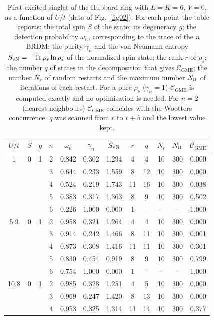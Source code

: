 \documentclass[12pt]{article}
\begin{document}
\begin{table}
\caption{First excited singlet of the Hubbard ring with $L=K=6$, $V=0$, as a function of $U/t$ (data of Fig.~\ref{fig02}). For each point the table reports: the total spin $S$ of the state; its degeneracy $g$; the detection probability $\omega_n$, corresponding to the trace of the $n$BRDM; the purity $\gamma_n$ and the von Neumann entropy $S_{\rm vN}=-\mathrm{Tr}\,\rho_s\ln\rho_s$ of the normalized spin state; the rank $r$ of $\rho_s$; the number $q$ of states in the decomposition that gives $\mathcal{C}_{\mathrm{GME}}$; the number $N_r$ of random restarts and the maximum number $N_{\rm it}$ of iterations of each restart. For a pure $\rho_s$ ($\gamma_n=1$) $\mathcal{C}_{\mathrm{GME}}$ is computed exactly and no optimisation is needed. For $n=2$ (nearest neighbours) $\mathcal{C}_{\mathrm{GME}}$ coincides with the Wootters concurrence. $q$ was scanned from $r$ to $r+5$ and the lowest value kept.}
\label{tab:uscan_es_L6}
\begin{ruledtabular}
\begin{tabular}{cccccccccccc}
$U/t$ & $S$ & $g$ & $n$ & $\omega_n$ & $\gamma_n$ & $S_{\rm vN}$ & $r$ & $q$ & $N_r$ & $N_{\rm it}$ & $\mathcal{C}_{\mathrm{GME}}$ \\
\hline
1 & 0 & 1 & 2 & 0.842 & 0.302 & 1.294 & 4 & 4 & 10 & 300 & 0.000 \\
 & &  & 3 & 0.644 & 0.233 & 1.559 & 8 & 12 & 10 & 300 & 0.000 \\
 & &  & 4 & 0.524 & 0.219 & 1.743 & 11 & 16 & 10 & 300 & 0.038 \\
 & &  & 5 & 0.383 & 0.317 & 1.363 & 8 & 9 & 10 & 300 & 0.502 \\
 & &  & 6 & 0.226 & 1.000 & 0.000 & 1 & -- & -- & -- & 1.000 \\
\hline
5.9 & 0 & 1 & 2 & 0.958 & 0.321 & 1.264 & 4 & 4 & 10 & 300 & 0.000 \\
 & &  & 3 & 0.914 & 0.242 & 1.466 & 8 & 11 & 10 & 300 & 0.001 \\
 & &  & 4 & 0.873 & 0.308 & 1.416 & 11 & 11 & 10 & 300 & 0.301 \\
 & &  & 5 & 0.830 & 0.454 & 0.919 & 8 & 9 & 10 & 300 & 0.799 \\
 & &  & 6 & 0.754 & 1.000 & 0.000 & 1 & -- & -- & -- & 1.000 \\
\hline
10.8 & 0 & 1 & 2 & 0.985 & 0.328 & 1.251 & 4 & 5 & 10 & 300 & 0.000 \\
 & &  & 3 & 0.969 & 0.247 & 1.420 & 8 & 13 & 10 & 300 & 0.000 \\
 & &  & 4 & 0.953 & 0.325 & 1.314 & 11 & 14 & 10 & 300 & 0.377 \\

\end{tabular}
\end{ruledtabular}
\end{table}
\end{document}
